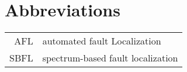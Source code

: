 \chapter*{Abbreviations} 
\begin{longtable}{rl}
AFL & automated fault Localization\\
SBFL & spectrum-based fault localization
\end{longtable}